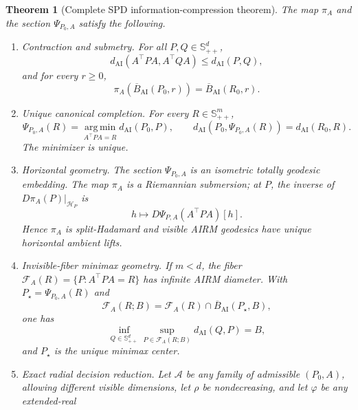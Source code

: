 \documentclass[10pt,a4paper]{amsart}
\newtheorem{theorem}{Theorem}
\newcommand{\AI}{\mathrm{AI}}
\newcommand{\SPD}{\mathbb S_{++}}
\newcommand{\argminop}{\operatorname*{arg\,min}}
\newcommand{\dai}{d_{\AI}}
\begin{document}
\begin{theorem}[Complete SPD information-compression theorem]
\label{thm:spd-compression}
The map \(\pi_A\) and the section \(\Psi_{P_0,A}\) satisfy the following.
\begin{enumerate}[label=(\Alph*),leftmargin=*]
  \item \emph{Contraction and submetry.}  For all \(P,Q\in\SPD^d\),
  \begin{equation}
    \dai(A^\top PA,A^\top QA)\le\dai(P,Q),
    \label{eq:spd-contraction}
  \end{equation}
  and for every \(r\ge0\),
  \begin{equation}
    \pi_A(\overline B_{\AI}(P_0,r))
    =\overline B_{\AI}(R_0,r).
    \label{eq:spd-ball-submetry}
  \end{equation}
  \item \emph{Unique canonical completion.}  For every \(R\in\SPD^m\),
  \begin{equation}
    \boxed{
    \Psi_{P_0,A}(R)
    =\argminop_{A^\top PA=R}\dai(P_0,P),
    \qquad
    \dai(P_0,\Psi_{P_0,A}(R))=\dai(R_0,R).}
    \label{eq:spd-shortest-completion}
  \end{equation}
  The minimizer is unique.
  \item \emph{Horizontal geometry.}  The section \(\Psi_{P_0,A}\) is an
  isometric totally geodesic embedding.  The map \(\pi_A\) is a Riemannian
  submersion; at \(P\), the inverse of
  \(D\pi_A(P)|_{\mathcal H_P}\) is
  \begin{equation}
    h\longmapsto D\Psi_{P,A}(A^\top PA)[h].
    \label{eq:spd-horizontal-lift}
  \end{equation}
  Hence \(\pi_A\) is split-Hadamard and visible AIRM geodesics have unique
  horizontal ambient lifts.
  \item \emph{Invisible-fiber minimax geometry.}  If \(m<d\), the fiber
  \(\mathcal F_A(R)=\{P:A^\top PA=R\}\) has infinite AIRM diameter.  With
  \(P_\star=\Psi_{P_0,A}(R)\) and
  \[
    \mathcal F_A(R;B)
    =\mathcal F_A(R)\cap\overline B_{\AI}(P_\star,B),
  \]
  one has
  \begin{equation}
    \inf_{Q\in\SPD^d}\sup_{P\in\mathcal F_A(R;B)}\dai(Q,P)=B,
    \label{eq:spd-minimax}
  \end{equation}
  and \(P_\star\) is the unique minimax center.
  \item \emph{Exact radial decision reduction.}  Let \(\mathcal A\) be any
  family of admissible \((P_0,A)\), allowing different visible dimensions,
  let \(\rho\) be nondecreasing, and let \(\varphi\) be any extended-real

\end{enumerate}
\end{theorem}
\end{document}
